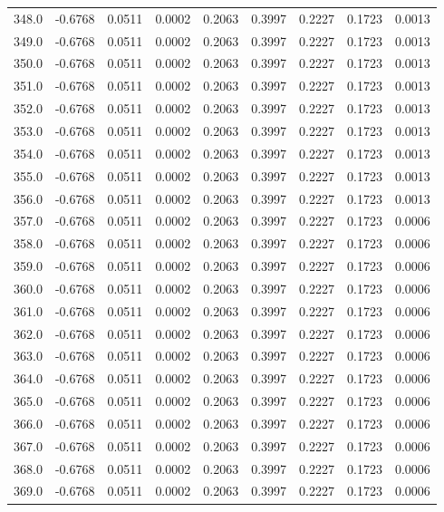\begin{longtable}{lrrrrrrrr}
348.0 & -0.6768 & 0.0511 & 0.0002 & 0.2063 & 0.3997 & 0.2227 & 0.1723 & 0.0013 \\
349.0 & -0.6768 & 0.0511 & 0.0002 & 0.2063 & 0.3997 & 0.2227 & 0.1723 & 0.0013 \\
350.0 & -0.6768 & 0.0511 & 0.0002 & 0.2063 & 0.3997 & 0.2227 & 0.1723 & 0.0013 \\
351.0 & -0.6768 & 0.0511 & 0.0002 & 0.2063 & 0.3997 & 0.2227 & 0.1723 & 0.0013 \\
352.0 & -0.6768 & 0.0511 & 0.0002 & 0.2063 & 0.3997 & 0.2227 & 0.1723 & 0.0013 \\
353.0 & -0.6768 & 0.0511 & 0.0002 & 0.2063 & 0.3997 & 0.2227 & 0.1723 & 0.0013 \\
354.0 & -0.6768 & 0.0511 & 0.0002 & 0.2063 & 0.3997 & 0.2227 & 0.1723 & 0.0013 \\
355.0 & -0.6768 & 0.0511 & 0.0002 & 0.2063 & 0.3997 & 0.2227 & 0.1723 & 0.0013 \\
356.0 & -0.6768 & 0.0511 & 0.0002 & 0.2063 & 0.3997 & 0.2227 & 0.1723 & 0.0013 \\
357.0 & -0.6768 & 0.0511 & 0.0002 & 0.2063 & 0.3997 & 0.2227 & 0.1723 & 0.0006 \\
358.0 & -0.6768 & 0.0511 & 0.0002 & 0.2063 & 0.3997 & 0.2227 & 0.1723 & 0.0006 \\
359.0 & -0.6768 & 0.0511 & 0.0002 & 0.2063 & 0.3997 & 0.2227 & 0.1723 & 0.0006 \\
360.0 & -0.6768 & 0.0511 & 0.0002 & 0.2063 & 0.3997 & 0.2227 & 0.1723 & 0.0006 \\
361.0 & -0.6768 & 0.0511 & 0.0002 & 0.2063 & 0.3997 & 0.2227 & 0.1723 & 0.0006 \\
362.0 & -0.6768 & 0.0511 & 0.0002 & 0.2063 & 0.3997 & 0.2227 & 0.1723 & 0.0006 \\
363.0 & -0.6768 & 0.0511 & 0.0002 & 0.2063 & 0.3997 & 0.2227 & 0.1723 & 0.0006 \\
364.0 & -0.6768 & 0.0511 & 0.0002 & 0.2063 & 0.3997 & 0.2227 & 0.1723 & 0.0006 \\
365.0 & -0.6768 & 0.0511 & 0.0002 & 0.2063 & 0.3997 & 0.2227 & 0.1723 & 0.0006 \\
366.0 & -0.6768 & 0.0511 & 0.0002 & 0.2063 & 0.3997 & 0.2227 & 0.1723 & 0.0006 \\
367.0 & -0.6768 & 0.0511 & 0.0002 & 0.2063 & 0.3997 & 0.2227 & 0.1723 & 0.0006 \\
368.0 & -0.6768 & 0.0511 & 0.0002 & 0.2063 & 0.3997 & 0.2227 & 0.1723 & 0.0006 \\
369.0 & -0.6768 & 0.0511 & 0.0002 & 0.2063 & 0.3997 & 0.2227 & 0.1723 & 0.0006 \\

\end{longtable}
